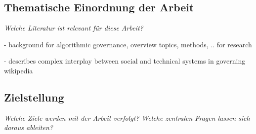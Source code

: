 \documentclass[pdftex,a4paper,11pt]{scrartcl}
\begin{document}
\subsection{Thematische Einordnung der Arbeit}
\noindent \emph{Welche Literatur ist relevant für diese Arbeit?}
\begin{comment}
\begin{itemize}
	\item Nutzen Sie Ihr vom Betreuer/in bereitgestellt Literatur und (!) nutzen Sie Google Scholar für Ihre weitere Recherche. Das HCC.lab forscht insbesondere in den Bereichen Computer Supported Cooperative Work and Human-Computer Interaction. Daher sind zwei Konferenzen mit den dazugehörigen Publikationen von besonderen Interesse: CHI (Annual SIGCHI Conference: Human Factors in Computing Systems) und CSCW (Computer Supported Cooperative Work). Diese Konferenzen und noch einige mehr können auf der SIGCHI Webseite gefunden werden \cite{sigchi:2015}. Die dazugehörigen Publikationen in der Digital Library von ACM \cite{acm:2015}.
	\item Bitte geben Sie die relevanten Inhalte der Artikel kurz wieder.
	\item Das Ausarbeiten von ausgewählter Literatur bzw. verwandten Arbeiten hilft Ihnen, Ihre Ziele im nachfolgenden Abschnitt klarer zu definieren. Daher ist eine Auseinandersetzung mit der Literatur von Beginn an notwendig, auch wenn es zu diesem Zeitpunkt noch nicht erschöpfend erfolgen kann.
\end{itemize}
\end{comment}

\cite{DanaherEtAl2017}
- background for algorithmic governance, overview topics, methods, .. for research

\cite{Geiger2017}
- describes complex interplay between social and technical systems in governing wikipedia

\cite{GeiHal2017}

\subsection{Zielstellung}
\noindent \emph{Welche Ziele werden mit der Arbeit verfolgt? Welche zentralen Fragen lassen sich daraus ableiten?}
\begin{comment}
\begin{itemize}
	\item Die Ziele sollten so spezifisch wie möglich sein. Das hilft Ihnen im Verlauf der Umsetzung zu prüfen, ob Sie Ihre Ziele erreichen konnten. Bitte achten Sie darauf, dass die gesetzten Ziele realistisch sind und das Sie in der Lage sind, das erfolgreiche Erreichen dieser Ziele im Bereich Evaluation zu prüfen.
\end{itemize}
\end{comment}
\end{document}

